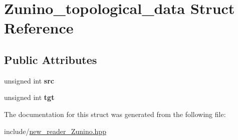 \hypertarget{structZunino__topological__data}{
\section{Zunino\_\-topological\_\-data Struct Reference}
\label{structZunino__topological__data}
}
\subsection*{Public Attributes}
\begin{DoxyCompactItemize}
\item 
\hypertarget{structZunino__topological__data_a4775b816ecc3ccd5b21dd48e972831e2}{
unsigned int {\bfseries src}}
\label{structZunino__topological__data_a4775b816ecc3ccd5b21dd48e972831e2}

\item 
\hypertarget{structZunino__topological__data_a80b7569157acbcef935a6aa0b6191171}{
unsigned int {\bfseries tgt}}
\label{structZunino__topological__data_a80b7569157acbcef935a6aa0b6191171}

\end{DoxyCompactItemize}


The documentation for this struct was generated from the following file:\begin{DoxyCompactItemize}
\item 
include/\hyperlink{new__reader__Zunino_8hpp}{new\_\-reader\_\-Zunino.hpp}\end{DoxyCompactItemize}
